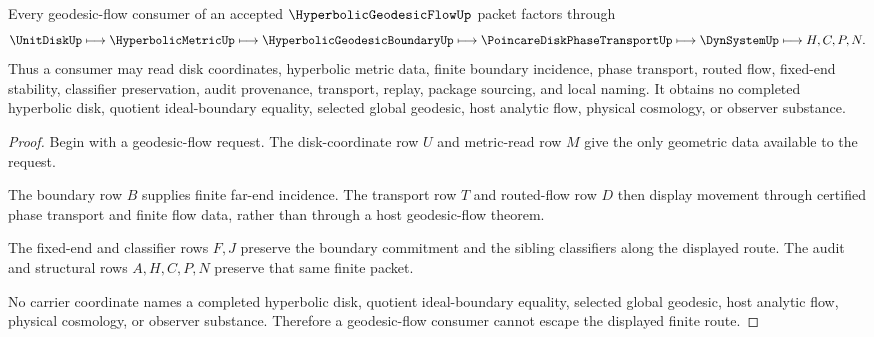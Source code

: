 \begin{theorem}
\label{thm:hyperbolic-geodesic-flow-fixed-end-nonescape}
Every geodesic-flow consumer of an accepted $\HyperbolicGeodesicFlowUp$ packet factors through
$$
\UnitDiskUp \longmapsto \HyperbolicMetricUp \longmapsto \HyperbolicGeodesicBoundaryUp \longmapsto \PoincareDiskPhaseTransportUp \longmapsto \DynSystemUp \longmapsto H,C,P,N .
$$
Thus a consumer may read disk coordinates, hyperbolic metric data, finite boundary incidence, phase transport, routed flow, fixed-end stability, classifier preservation, audit provenance, transport, replay, package sourcing, and local naming. It obtains no completed hyperbolic disk, quotient ideal-boundary equality, selected global geodesic, host analytic flow, physical cosmology, or observer substance.
\end{theorem}
\begin{proof}
Begin with a geodesic-flow request. The disk-coordinate row $U$ and metric-read row $M$ give the only geometric data available to the request.

The boundary row $B$ supplies finite far-end incidence. The transport row $T$ and routed-flow row $D$ then display movement through certified phase transport and finite flow data, rather than through a host geodesic-flow theorem.

The fixed-end and classifier rows $F,J$ preserve the boundary commitment and the sibling classifiers along the displayed route. The audit and structural rows $A,H,C,P,N$ preserve that same finite packet.

No carrier coordinate names a completed hyperbolic disk, quotient ideal-boundary equality, selected global geodesic, host analytic flow, physical cosmology, or observer substance. Therefore a geodesic-flow consumer cannot escape the displayed finite route.
\end{proof}



